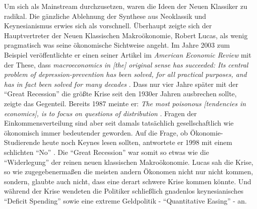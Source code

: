 Um sich als Mainstream durchzusetzen, waren die Ideen der Neuen Klassiker zu radikal. Die gänzliche Ablehnung der Synthese aus Neoklassik und Keynesianismus erwies sich als vorschnell. Überhaupt zeigte sich der Hauptvertreter der Neuen Klassischen Makroökonomie, Robert Lucas, als wenig pragmatisch was seine ökonomische Sichtweise angeht. Im Jahre 2003 zum Beispiel veröffentlichte er einen seiner Artikel im \textit{American Economic Review} mit der These, dass \textit{macroeconomics in [the] original sense has succeeded: Its central problem of depression-prevention has been solved, for all practical purposes, and has in fact been solved for many decades} \parencite[S. 1]{Lucas2003}. 
Dass nur vier Jahre später mit der "`Great Recession"' die größte Krise seit den 1930er Jahren ausbrechen sollte, zeigte das Gegenteil. Bereits 1987 meinte er: \textit{The most poisonous [tendencies in economics], is to focus on questions of distribution} \parencite{Lucas1987}. Fragen der Einkommensverteilung sind aber seit damals tatsächlich gesellschaftlich wie ökonomisch immer bedeutender geworden. Auf die Frage, ob Ökonomie-Studierende heute noch Keynes lesen sollten, antwortete er 1998 mit einem schlichten "`No"' \parencite{Lucas2013}. Die "`Great Recession"' war somit so etwas wie die "`Widerlegung"' der reinen neuen klassischen Makroökonomie. Lucas sah die Krise, so wie zugegebenermaßen die meisten andern Ökonomen nicht nur nicht kommen, sondern, glaubte auch nicht, dass eine derart schwere Krise kommen könnte. Und während der Krise wendeten die Politiker schließlich gnadenlos keynesianisches "`Deficit Spending"' sowie eine extreme Geldpolitik - "`Quantitative Easing"' - an. 


